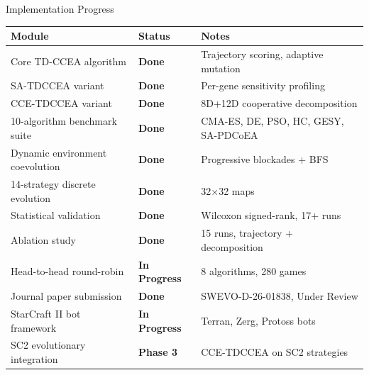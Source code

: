 \documentclass[aspectratio=169, 10pt]{beamer}
\begin{document}
\begin{frame}{Implementation Progress}
\scriptsize
\renewcommand{\arraystretch}{1.05}
\begin{tabular}{p{5.2cm}p{2.3cm}p{4.5cm}}
    \toprule
    \textbf{Module} & \textbf{Status} & \textbf{Notes}\\
    \midrule
    Core TD-CCEA algorithm          & \textcolor{doneGreen}{\textbf{Done}} & Trajectory scoring, adaptive mutation\\
    SA-TDCCEA variant               & \textcolor{doneGreen}{\textbf{Done}} & Per-gene sensitivity profiling\\
    CCE-TDCCEA variant              & \textcolor{doneGreen}{\textbf{Done}} & 8D+12D cooperative decomposition\\
    10-algorithm benchmark suite    & \textcolor{doneGreen}{\textbf{Done}} & CMA-ES, DE, PSO, HC, GESY, SA-PDCoEA\\
    Dynamic environment coevolution & \textcolor{doneGreen}{\textbf{Done}} & Progressive blockades + BFS\\
    14-strategy discrete evolution  & \textcolor{doneGreen}{\textbf{Done}} & 32$\times$32 maps\\
    Statistical validation          & \textcolor{doneGreen}{\textbf{Done}} & Wilcoxon signed-rank, 17+ runs\\
    Ablation study                  & \textcolor{doneGreen}{\textbf{Done}} & 15 runs, trajectory + decomposition\\
    Head-to-head round-robin        & \textcolor{progAmber}{\textbf{In Progress}} & 8 algorithms, 280 games\\
    Journal paper submission        & \textcolor{doneGreen}{\textbf{Done}} & SWEVO-D-26-01838, Under Review\\
    StarCraft II bot framework      & \textcolor{progAmber}{\textbf{In Progress}} & Terran, Zerg, Protoss bots\\
    SC2 evolutionary integration    & \textcolor{pendGrey}{\textbf{Phase 3}} & CCE-TDCCEA on SC2 strategies\\
    \bottomrule
\end{tabular}
\end{frame}
\end{document}
